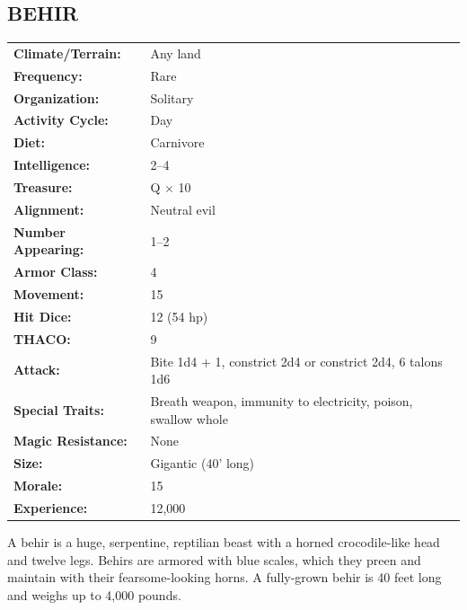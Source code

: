 \pagebreak

\begin{multicols}{2}

\noindent
\begin{minipage}{\columnwidth}

\subsection{BEHIR}

\noindent
\begin{tabular}{p{}p{}}
\textbf{Climate/Terrain:}	& Any land \\
\textbf{Frequency:} 		& Rare \\
\textbf{Organization:} 		& Solitary \\
\textbf{Activity Cycle:} 	& Day \\
\textbf{Diet:} 				& Carnivore \\
\textbf{Intelligence:} 		& 2--4 \\
\textbf{Treasure:} 			& Q $\times$ 10 \\
\textbf{Alignment:} 		& Neutral evil \\
\hline
\textbf{Number Appearing:} 	& 1--2 \\
\textbf{Armor Class:} 		& 4 \\
\textbf{Movement:} 			& 15 \\
\textbf{Hit Dice:} 			& 12 (54 hp) \\
\textbf{THACO:} 			& 9 \\
\textbf{Attack:} 			& Bite 1d4 + 1, constrict 2d4 or constrict 2d4, 6 talons 1d6	\\
\textbf{Special Traits:} 	& Breath weapon, immunity to electricity, poison, swallow whole \\
\textbf{Magic Resistance:} 	& None \\
\textbf{Size:} 				& Gigantic (40' long) \\
\textbf{Morale:} 			& 15 \\
\textbf{Experience:} 		& 12,000 \\ %
\end{tabular}

\end{minipage}

A behir is a huge, serpentine, reptilian beast with a horned crocodile-like head and twelve legs. Behirs are armored with blue scales, which they preen and maintain with their fearsome-looking horns. A fully-grown behir is 40 feet long and weighs up to 4,000 pounds.


\end{multicols}
